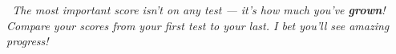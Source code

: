 {\vfill

\begin{tcolorbox}[
    enhanced,
    colback=funPurple!8,
    colframe=funPurple!50,
    arc=10pt,
    boxrule=1.5pt,
    left=5mm, right=5mm, top=3mm, bottom=3mm,
]
    \begin{minipage}[c]{0.08\linewidth}
        \centering
        \iconOwl[1.2cm]
    \end{minipage}%
    \hfill
    \begin{minipage}[c]{0.88\linewidth}
        \small\itshape\color{funPurpleDark}
        \faQuoteLeft~The most important score isn't on any test ---
        it's how much you've \textbf{grown}! Compare your scores from your
        first test to your last. I bet you'll see amazing progress!~\faQuoteRight
    \end{minipage}
\end{tcolorbox}

}

\newpage
